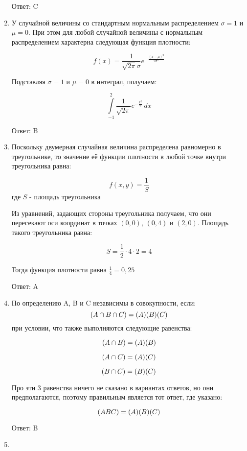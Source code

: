 \documentclass[11pt, a4paper]{article}
\let\P\relax
\DeclareMathOperator{\P}{\mathbb{P}}
\theoremstyle{definition}
\begin{document}
\begin{enumerate}
	Ответ: C
	
	
	
	\item 
	
	У случайной величины со стандартным нормальным распределением $\sigma=1$ и $\mu=0$. 
	При этом для любой случайной величины с нормальным распределением характерна следующая функция плотности:
	
	\[
	f(x)=\frac{1}{\sqrt{2\pi}\sigma} e^{-\frac{(x-\mu)^2}{2\sigma^2}}
	\]
	
	Подставляя $\sigma=1$ и $\mu=0$ в интеграл, получаем:
	
	\[
	\int\limits_{-1}^2 \frac{1}{\sqrt{2\pi}} e^{-\frac{x^2}{2}}\, dx
	\]
	
	Ответ: B
	
	
	
	\item 
	
	Поскольку двумерная случайная величина распределена равномерно в треугольнике, то значение её функции плотности в любой точке внутри треугольника равна:
	
	\[
	f(x,y)=\frac{1}{S}
	\]
	где $S$ - площадь треугольника
	
	Из уравнений, задающих стороны треугольника получаем, что они пересекают оси координат в точках $(0,0)$, $(0,4)$ и $(2,0)$. 
	Площадь такого треугольника равна:
	
	\[
	S=\frac{1}{2} \cdot 4 \cdot 2=4 
	\]
	
	Тогда функция плотности равна $\frac{1}{4}=0,25$
	
	Ответ: A
	
	
	\item 
	
	По определению A, B и C независимы в совокупности, если: 
	\[
	\P(A\cap B\cap C)=\P(A)\P(B)\P(C)
	\] 
	при условии, что также выполняются следующие равенства:
	
	\[
	\P(A\cap B)=\P(A)\P(B)
	\]
	
	\[
	\P(A\cap C)=\P(A)\P(C)
	\]
	
	\[
	\P(B\cap C)=\P(B)\P(C)
	\]
	
	Про эти 3 равенства ничего не сказано в вариантах ответов, но они предполагаются, поэтому правильным является тот ответ, где указано:
	
	\[
	\P(ABC)=\P(A)\P(B)\P(C)
	\]
	
	Ответ: B
	
	\item 	
	

\end{enumerate}
\end{document}
